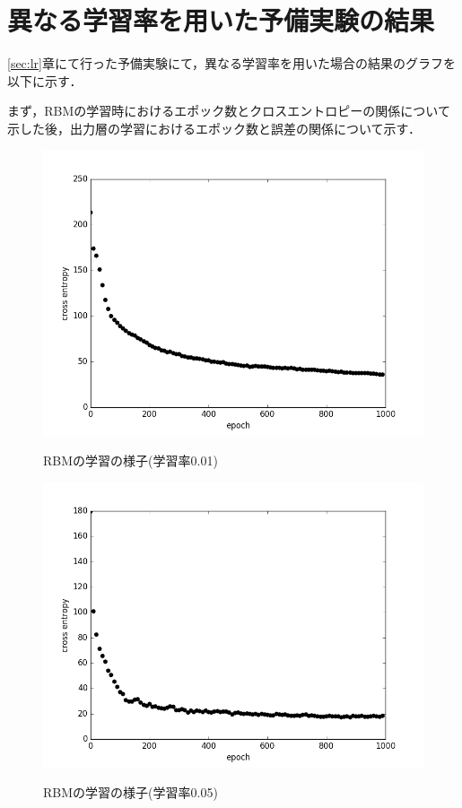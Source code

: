 \chapter{異なる学習率を用いた予備実験の結果}

\ref{sec:lr}章にて行った予備実験にて，異なる学習率を用いた場合の結果のグラフを以下に示す．

まず，RBMの学習時におけるエポック数とクロスエントロピーの関係について示した後，出力層の学習におけるエポック数と誤差の関係について示す．

\begin{figure}[]
\begin{center}
   \includegraphics[scale=0.8]{./koki/ent001.png} \\
   \caption{RBMの学習の様子(学習率0.01)}
\end{center}
\end{figure}

\begin{figure}[]
\begin{center}
   \includegraphics[scale=0.8]{./koki/ent005.png} \\
   \caption{RBMの学習の様子(学習率0.05)}
\end{center}
\end{figure}

